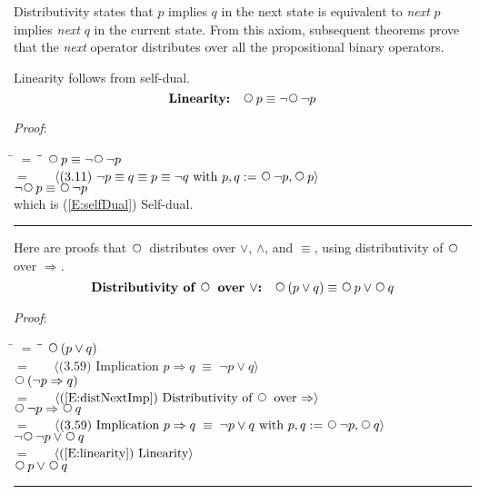 \documentclass[12pt, fleqn, leqno]{article}
\newcommand{\lgap}{2pt}                             %
\newcommand{\mymathindent}{24pt}                    %
\newcommand{\equivs}{\ensuremath{\;\equiv\;}}       %
\newcommand{\impl}{\ensuremath{\Rightarrow}}        %
\newcommand{\Next}{\;\,\text{\raisebox{3.5pt}{\circle{6}}}}
\newcommand{\myqed}{\rule[-.23ex]{1.2ex}{2.0ex}}
\newcommand{\myqedtab}{\hspace{384pt}}              %
\newcommand{\Gll} {\langle}                         %
\newcommand{\Ggg} {\rangle}                         %
\newcommand{\Hint}[1]     {\ \ \ $\Gll              \mbox{#1} \Ggg$ }   %
\begin{document}
Distributivity states that $p$ implies $q$ in the next state is equivalent to \textit{next} $p$ implies \textit{next} $q$ in the current state.
From this axiom, subsequent theorems prove that the \textit{next} operator distributes over all the propositional binary operators.

Linearity follows from self-dual.
\begin{equation}\label{E:linearity}
\textbf{Linearity:}\quad \Next p \equiv \neg\Next\neg p
\end{equation}

\emph{Proof}:
\begin{tabbing}
\hspace{\mymathindent} \= $= \;$ \= \myqedtab \= \kill
  \> \>   $\Next p \equiv \neg\Next\neg p$\\[\lgap]
  \> $=$  \>  \Hint{(3.11) $\neg p \equiv q \equiv p \equiv \neg q$ with $p,q := \Next\neg p, \Next p$} \\[\lgap]
  \> \>   $\neg\Next p \equiv \Next\neg p$ \\[\lgap]
  \> which is (\ref{E:selfDual}) Self-dual. \quad \myqed
\end{tabbing}

Here are proofs that $\Next$ distributes over $\lor$, $\land$, and $\equiv$, using
distributivity of $\Next$ over $\impl$.
\begin{equation}\label{E:distNextOr}
\textbf{Distributivity of $\Next$ over $\lor$:}\quad \Next (p \lor q) \equiv \Next p \lor \Next q
\end{equation}

\emph{Proof}:
\begin{tabbing}
\hspace{\mymathindent} \= $= \;$ \= \myqedtab \= \kill
	\> \>   $\Next(p \lor q)$\\[\lgap]
	\> $=$  \>  \Hint{(3.59) Implication $p\impl q \equivs \neg p \lor q$}\\[\lgap]
	\> \>   $\Next(\neg p \impl q)$\\[\lgap]
	\> $=$  \>  \Hint{(\ref{E:distNextImp}) Distributivity of $\Next$ over $\impl$}\\[\lgap]
	\> \>   $\Next\neg p \impl \Next q$\\[\lgap]
	\> $=$  \>  \Hint{(3.59) Implication $p\impl q \equivs \neg p \lor q$ with $p,q := \Next\neg p, \Next q$}\\[\lgap]
	\> \>   $\neg\Next\neg p \lor \Next q$\\[\lgap]
	\> $=$  \>  \Hint{(\ref{E:linearity}) Linearity}\\[\lgap]
	\> \>   $\Next p \lor \Next q$ \quad \myqed
\end{tabbing}
\end{document}
